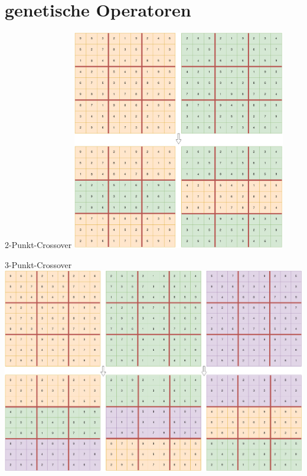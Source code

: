 \section{genetische Operatoren}
\begin{frame}{2-Punkt-Crossover}
    \centering
    \includegraphics[width=0.7\textwidth]{Pictures/2-Punkt-Crossover.png}
\end{frame}
\begin{frame}{3-Punkt-Crossover}
    \centering
    \includegraphics[width=\textwidth]{Pictures/3-Punkt-Crossover.png}
\end{frame}